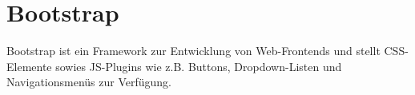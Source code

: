 \section{Bootstrap}
Bootstrap \cite{boot} ist ein Framework zur Entwicklung von Web-Frontends und stellt CSS-Elemente sowies JS-Plugins wie z.B. Buttons, Dropdown-Listen und Na\-vi\-ga\-tions\-menüs zur Verfügung.